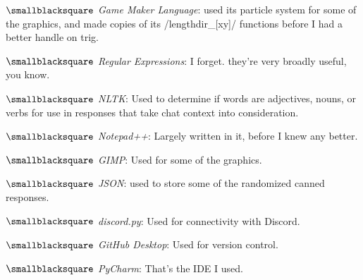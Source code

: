 \documentclass[10mm,letterpaper,notitlepage]{article}
\begin{document}
{{								$\smallblacksquare$ \textit{Game Maker Language}: used its particle system for some of the graphics, and made copies of its /lengthdir\_[xy]/ functions before I had a better handle on trig.
								
								$\smallblacksquare$ \textit{Regular Expressions}: I forget. they're very broadly useful, you know.
								
								$\smallblacksquare$ \textit{NLTK}: Used to determine if words are adjectives, nouns, or verbs for use in responses that take chat context into consideration.
								
								$\smallblacksquare$ \textit{Notepad++}: Largely written in it, before I knew any better.
								
								$\smallblacksquare$ \textit{GIMP}: Used for some of the graphics.
								
								$\smallblacksquare$ \textit{JSON}: used to store some of the randomized canned responses.
								
								$\smallblacksquare$ \textit{discord.py}: Used for connectivity with Discord.
								
								$\smallblacksquare$ \textit{GitHub Desktop}: Used for version control.
								
								$\smallblacksquare$ \textit{PyCharm}: That's the IDE I used.
								
								\setlength{\parindent}{\parindent-4mm}
							\par}
							{\color[RGB]{0, 0, 0}
							\fontsize{2.25mm}{3.0mm}\selectfont
									{\color[RGB]{108, 29, 169}
									\fontsize{4.5mm}{6.0mm}\selectfont
									\color[RGB]{98, 99, 185}{{ }}\color[RGB]{103, 75, 178}{{ }}
									\par}
							\nopagebreak
							
}}
\end{document}
